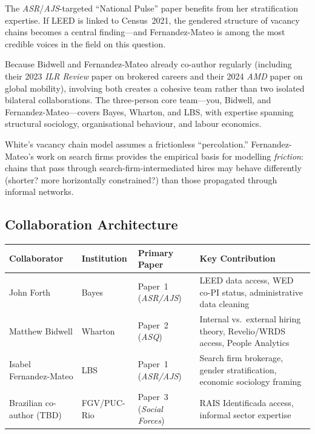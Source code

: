 \documentclass[a4paper]{tufte-handout}
\begin{document}
\begin{description}[style=nextline, font=\normalfont\itshape]
	\item[Paper~1 co-author]
	      The \emph{ASR}/\emph{AJS}-targeted ``National Pulse'' paper benefits from her stratification expertise. If LEED is linked to Census~2021, the gendered structure of vacancy chains becomes a central finding---and Fernandez-Mateo is among the most credible voices in the field on this question.
	\item[The Bidwell--Fernandez-Mateo axis]
	      Because Bidwell and Fernandez-Mateo already co-author regularly (including their 2023 \emph{ILR Review} paper on brokered careers and their 2024 \emph{AMD} paper on global mobility), involving both creates a cohesive team rather than two isolated bilateral collaborations. The three-person core team---you, Bidwell, and Fernandez-Mateo---covers Bayes, Wharton, and LBS, with expertise spanning structural sociology, organisational behaviour, and labour economics.
	\item[Brokerage theory integration]
	      White's vacancy chain model assumes a frictionless ``percolation.'' Fernandez-Mateo's work on search firms provides the empirical basis for modelling \emph{friction}: chains that pass through search-firm-intermediated hires may behave differently (shorter? more horizontally constrained?) than those propagated through informal networks.
\end{description}


\subsection{Collaboration Architecture}

\begin{fullwidth}
	\smallskip
	\small
	\begin{tabularx}{\linewidth}{@{}l l l X@{}}
		\toprule
		\textbf{Collaborator}     & \textbf{Institution} & \textbf{Primary Paper}         & \textbf{Key Contribution}                                                   \\
		\midrule
		John Forth                & Bayes                & Paper~1 (\emph{ASR/AJS})       & LEED data access, WED co-PI status, administrative data cleaning            \\[4pt]
		Matthew Bidwell           & Wharton              & Paper~2 (\emph{ASQ})           & Internal vs.\ external hiring theory, Revelio/WRDS access, People Analytics \\[4pt]
		Isabel Fernandez-Mateo    & LBS                  & Paper~1 (\emph{ASR/AJS})       & Search firm brokerage, gender stratification, economic sociology framing    \\[4pt]
		Brazilian co-author (TBD) & FGV/PUC-Rio          & Paper~3 (\emph{Social Forces}) & RAIS Identificada access, informal sector expertise                         \\
		\bottomrule
	\end{tabularx}
	\smallskip
\end{fullwidth}
\end{document}
